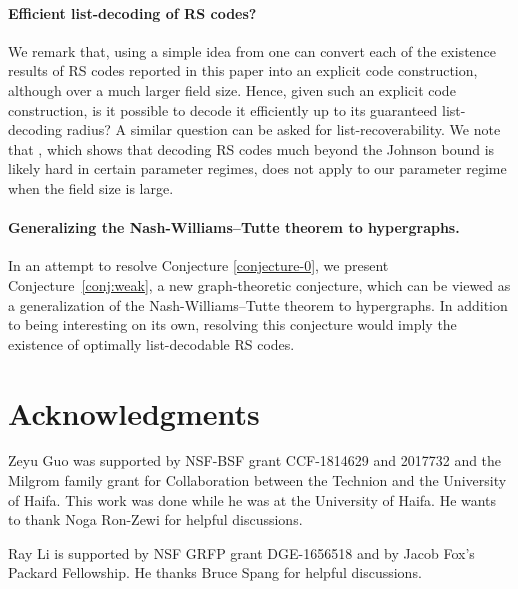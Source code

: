 \documentclass[11pt]{article}
\newcommand{\ryl}[1]{{\color{red} {\small [Ray: #1]}}}
\newcommand{\mkw}[1]{{\color{orange}{\small [Mary: #1]}}}
\begin{document}
\paragraph{Efficient list-decoding of RS codes?} We remark that, using a simple idea from \cite{shangguan2019combinatorial0} one can convert each of the existence results of RS codes reported in this paper into  an explicit code construction, although over a much larger field size. Hence, given such an explicit code construction, is it possible to decode it efficiently up to its guaranteed list-decoding radius? A similar question can be asked for list-recoverability.
We note that \cite{list-dec-discrete-log}, which shows that decoding RS codes much beyond the Johnson bound is likely hard in certain parameter regimes, does not apply to our parameter regime when the field size is large.



\paragraph{Generalizing the Nash-Williams--Tutte theorem to hypergraphs.} In an attempt to resolve Conjecture \ref{conjecture-0}, we present Conjecture~\ref{conj:weak}, a new graph-theoretic conjecture,  which can be viewed as a generalization of the  Nash-Williams--Tutte theorem to hypergraphs. In addition to being interesting on its own, resolving this conjecture would imply the existence of optimally list-decodable RS codes.




\section*{Acknowledgments}

\noindent Zeyu Guo was supported by  NSF-BSF grant CCF-1814629 and 2017732 and the Milgrom family grant for Collaboration between the Technion and the University of Haifa. This work was done while he was at the University of Haifa. He wants to thank Noga Ron-Zewi for helpful discussions.

Ray Li is supported by NSF GRFP grant DGE-1656518 and by Jacob Fox's Packard Fellowship. He thanks Bruce Spang for helpful discussions.
\end{document}
